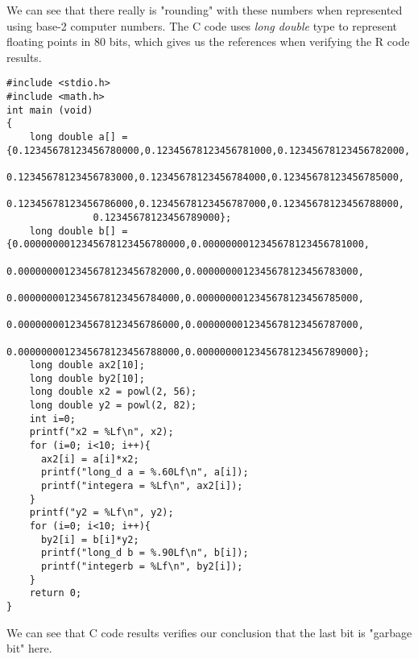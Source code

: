 \documentclass{article}\usepackage{graphicx, color}
\begin{document}
We can see that there really is "rounding" with these numbers when represented using
base-2 computer numbers. The C code uses \textit{long double} type to represent floating points in 80 bits, 
which gives us the references when verifying the R code results.
\newpage
\begin{lstlisting}
#include <stdio.h>
#include <math.h>
int main (void)
{
	long double a[] = {0.12345678123456780000,0.12345678123456781000,0.12345678123456782000,
			   0.12345678123456783000,0.12345678123456784000,0.12345678123456785000,
			   0.12345678123456786000,0.12345678123456787000,0.12345678123456788000,
			   0.12345678123456789000};
	long double b[] = {0.0000000012345678123456780000,0.0000000012345678123456781000,
			   0.0000000012345678123456782000,0.0000000012345678123456783000,
			   0.0000000012345678123456784000,0.0000000012345678123456785000,
			   0.0000000012345678123456786000,0.0000000012345678123456787000,
			   0.0000000012345678123456788000,0.0000000012345678123456789000};
	long double ax2[10];
	long double by2[10];
	long double x2 = powl(2, 56);
	long double y2 = powl(2, 82);
	int i=0;
	printf("x2 = %Lf\n", x2);
	for (i=0; i<10; i++){
	  ax2[i] = a[i]*x2;
	  printf("long_d a = %.60Lf\n", a[i]);
	  printf("integera = %Lf\n", ax2[i]);
	}
	printf("y2 = %Lf\n", y2);
	for (i=0; i<10; i++){
	  by2[i] = b[i]*y2;
	  printf("long_d b = %.90Lf\n", b[i]);
	  printf("integerb = %Lf\n", by2[i]);
	}
	return 0;
}
\end{lstlisting}
\hbox{}


We can see that C code results verifies our conclusion that the last bit is "garbage bit" here.
\end{document}
